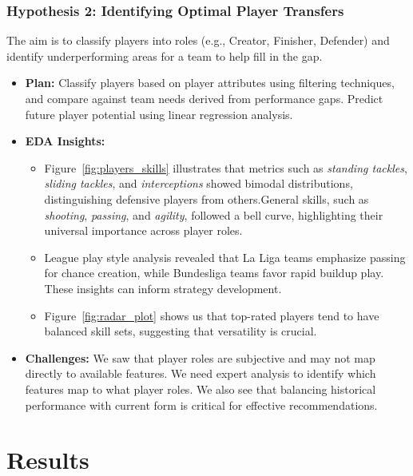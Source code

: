 \documentclass{article}
\begin{document}
\subsubsection{Hypothesis 2: Identifying Optimal Player Transfers}
The aim is to classify players into roles (e.g., Creator, Finisher, Defender) and identify underperforming areas for a team to help fill in the gap.
\begin{itemize}
    \item \textbf{Plan:} Classify players based on player attributes using filtering techniques, and compare against team needs derived from performance gaps. Predict future player potential using linear regression analysis.
    \item \textbf{EDA Insights:}
    \begin{itemize}
        \item Figure~\ref{fig:players_skills} illustrates that metrics such as \textit{standing tackles}, \textit{sliding tackles}, and \textit{interceptions} showed bimodal distributions, distinguishing defensive players from others.General skills, such as \textit{shooting}, \textit{passing}, and \textit{agility}, followed a bell curve, highlighting their universal importance across player roles.
        \item League play style analysis revealed that La Liga teams emphasize passing for chance creation, while Bundesliga teams favor rapid buildup play. These insights can inform strategy development.
        \item Figure~\ref{fig:radar_plot} shows us that top-rated players tend to have balanced skill sets, suggesting that versatility is crucial.
    \end{itemize}
    \item \textbf{Challenges:} We saw that player roles are subjective and may not map directly to available features. We need expert analysis to identify which features map to what player roles. We also see that balancing historical performance with current form is critical for effective recommendations.
\end{itemize}


\section{Results}
\end{document}
